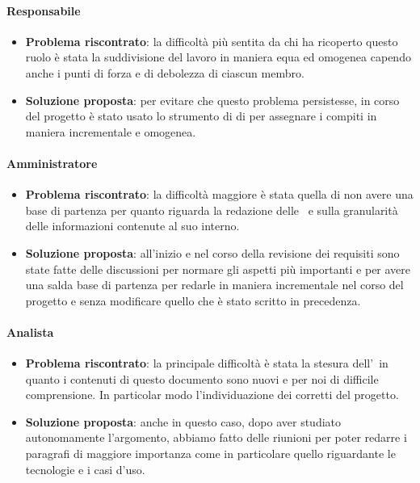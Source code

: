 		\paragraph{Responsabile}
			\begin{itemize}
				\item \textbf{Problema riscontrato}: la difficoltà più sentita da chi ha ricoperto questo ruolo è stata la suddivisione del lavoro in maniera equa ed omogenea capendo anche i punti di forza e di debolezza di ciascun membro.
				\item \textbf{Soluzione proposta}: per evitare che questo problema persistesse, in corso del progetto è stato usato lo strumento di  di  per assegnare i compiti in maniera incrementale e omogenea.
			\end{itemize}

		\paragraph{Amministratore}
			\begin{itemize}
				\item \textbf{Problema riscontrato}: la difficoltà maggiore è stata quella di non avere una base di partenza per quanto riguarda la redazione delle \NdP\ e sulla granularità delle informazioni contenute al suo interno.
				\item \textbf{Soluzione proposta}: all'inizio e nel corso della revisione dei requisiti sono state fatte delle discussioni per normare gli aspetti più importanti e per avere una salda base di partenza per redarle in maniera incrementale nel corso del progetto e senza modificare quello che è stato scritto in precedenza.
			\end{itemize}

		\paragraph{Analista}
			\begin{itemize}
				\item \textbf{Problema riscontrato}: la principale difficoltà è stata la stesura dell'\AdR\ in quanto i contenuti di questo documento sono nuovi e per noi di difficile comprensione. In particolar modo l'individuazione dei corretti  del progetto.
				\item \textbf{Soluzione proposta}: anche in questo caso, dopo aver studiato autonomamente l'argomento, abbiamo fatto delle riunioni per poter redarre i paragrafi di maggiore importanza come in particolare quello riguardante le tecnologie e i casi d'uso.
			\end{itemize}

